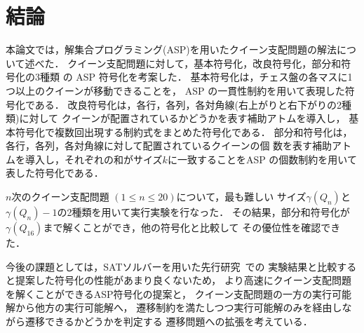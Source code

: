 \chapter{結論}\label{chap:conclusion}

本論文では，解集合プログラミング(ASP)を用いたクイーン支配問題の解法について述べた．
%
クイーン支配問題に対して，基本符号化，改良符号化，部分和符号化の3種類
の ASP 符号化を考案した．
%
基本符号化は，チェス盤の各マスに1つ以上のクイーンが移動できることを，
ASP の一貫性制約を用いて表現した符号化である．
%
改良符号化は，各行，各列，各対角線(右上がりと右下がりの2種類)に対して
クイーンが配置されているかどうかを表す補助アトムを導入し，
基本符号化で複数回出現する制約式をまとめた符号化である．
%
部分和符号化は，各行，各列，各対角線に対して配置されているクイーンの個
数を表す補助アトムを導入し，それぞれの和がサイズ$k$に一致することをASP
の個数制約を用いて表した符号化である．

$n$次のクイーン支配問題 $(1\leq n\leq 20)$について，最も難しい
サイズ$\gamma(Q_n)$と$\gamma(Q_n)-1$の2種類を用いて実行実験を行なった．
その結果，部分和符号化が$\gamma(Q_{16})$まで解くことができ，他の符号化と比較して
その優位性を確認できた．

今後の課題としては，SATソルバーを用いた先行研究~\cite{yamamoto21}での
実験結果と比較すると提案した符号化の性能があまり良くないため，
より高速にクイーン支配問題を解くことができるASP符号化の提案と，
クイーン支配問題の一方の実行可能解から他方の実行可能解へ，
遷移制約を満たしつつ実行可能解のみを経由しながら遷移できるかどうかを判定する
遷移問題への拡張を考えている．